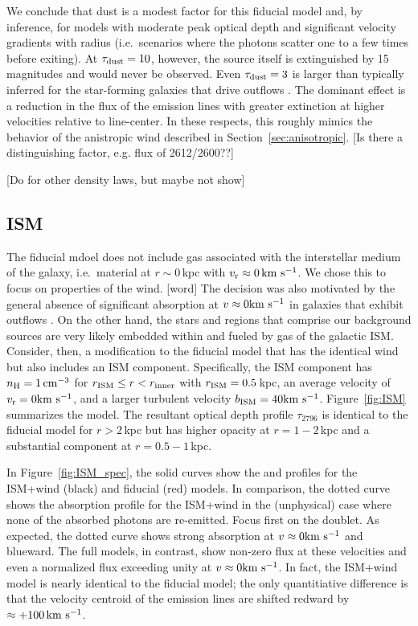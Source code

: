 \documentclass[12pt,preprint]{aastex}
\begin{document}
We conclude that dust is a modest factor for this fiducial model and,
by inference, for models with moderate peak optical depth and
significant velocity gradients with radius (i.e.\ scenarios where the
photons scatter one to a few times before exiting).
At $\tau_{\rm dust} = 10$, however, the source itself is
extinguished by 15\,magnitudes and would never be observed. 
Even $\tau_{\rm dust} = 3$ is larger than typically inferred for the
star-forming galaxies that drive outflows \citep[e.g.][]{dust}.
The dominant effect is a reduction in the flux of the emission lines
with greater extinction at higher velocities relative to line-center.
In these respects, this roughly mimics the behavior of the anistropic
wind described in Section~\ref{sec:anisotropic}. [Is there a
distinguishing factor, e.g. flux of 2612/2600??]

[Do for other density laws, but maybe not show]

\subsection{ISM}
\label{sec:ISM}

The fiducial mdoel does not include gas associated with
the interstellar medium of the galaxy, i.e.\ material at $r \sim
0$\,kpc with $v_{\rm r} \approx 0 \, {\rm km~s^{-1}}$.  We chose this to focus on
properties of the wind.  [word]  The decision was also motivated by
the general absence of significant absorption at $v \approx 0 {\rm km~s^{-1}}$
in galaxies that exhibit outflows
\citep[e.g.][]{wcp+09,steidel+10,rubin+10}.
On the other hand, the stars and  regions that comprise our
background sources are very likely embedded within and fueled by gas
of the galactic ISM.  
Consider, then, a modification to the fiducial model that has the
identical wind but also includes an ISM component. 
Specifically, the ISM component has $n_{\rm H} = 1 \, {\rm cm^{-3}}$ for
$r_{\rm ISM} \le r < r_{\rm inner}$ with $r_{\rm ISM} = 0.5$\,kpc, 
an average velocity of $v_{\rm r} = 0 {\rm km~s^{-1}}$, and a larger turbulent velocity $b_{\rm ISM} = 40 {\rm km~s^{-1}}$.
Figure~\ref{fig:ISM} summarizes the model.
The resultant optical depth profile $\tau_{2796}$ is identical to the
fiducial model for $r > 2$\,kpc but has higher opacity at $r=1-2$\,kpc
and a substantial component at $r = 0.5-1$\,kpc.

In Figure~\ref{fig:ISM_spec}, the solid curves show the  and
 profiles for the ISM+wind (black) and fiducial (red)
models. In comparison, the
dotted curve shows the absorption profile for the ISM+wind in the (unphysical) case
where none of the absorbed photons are re-emitted.   Focus first on the
 doublet.  As expected, the dotted curve shows strong
absorption at $v \approx 0 {\rm km~s^{-1}}$ and blueward.  The full models,
in contrast, show non-zero flux at these velocities and even a
normalized flux exceeding unity at $v \approx 0 {\rm km~s^{-1}}$.  In
fact, the ISM+wind model is nearly identical to the fiducial model;
the only quantitiative difference is that the velocity centroid of
the emission lines are shifted redward by $\approx +100 \, {\rm km~s^{-1}}$.
\end{document}
